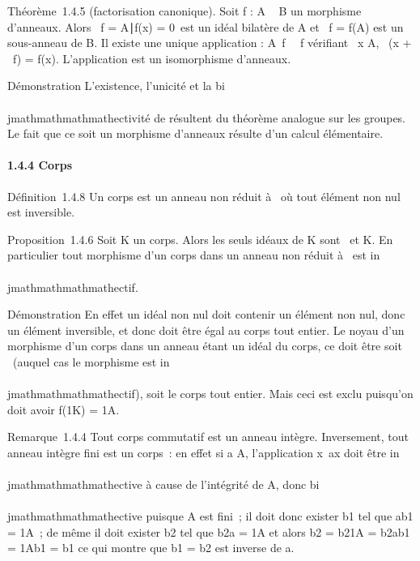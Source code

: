 Théorème~1.4.5 (factorisation canonique). Soit f : A \rightarrow~ B un morphisme
d'anneaux. Alors
\mathrmKer~f =
\x \in A∣f(x) =
0\ est un idéal bilatère de A et
\mathrmIm~f = f(A) est un
sous-anneau de B. Il existe une unique application
\overlinef :
A\diagup\mathrmKer~f
\rightarrow~\mathrmIm~f vérifiant
\forall~x \in A, \overlinef~(x
+ \mathrmKer~f) = f(x).
L'application \overlinef est un isomorphisme
d'anneaux.

Démonstration L'existence, l'unicité et la bi\\\\jmathmathmathmathectivité de
\overlinef résultent du théorème analogue sur les
groupes. Le fait que ce soit un morphisme d'anneaux résulte d'un calcul
élémentaire.

\paragraph{1.4.4 Corps}

Définition~1.4.8 Un corps est un anneau non réduit à
\0\ où tout élément non nul est
inversible.

Proposition~1.4.6 Soit K un corps. Alors les seuls idéaux de K sont
\0\ et K. En particulier tout
morphisme d'un corps dans un anneau non réduit à
\0\ est in\\\\jmathmathmathmathectif.

Démonstration En effet un idéal non nul doit contenir un élément non
nul, donc un élément inversible, et donc doit être égal au corps tout
entier. Le noyau d'un morphisme d'un corps dans un anneau étant un idéal
du corps, ce doit être soit \0\
(auquel cas le morphisme est in\\\\jmathmathmathmathectif), soit le corps tout entier. Mais
ceci est exclu puisqu'on doit avoir f(1K) = 1A.

Remarque~1.4.4 Tout corps commutatif est un anneau intègre. Inversement,
tout anneau intègre fini est un corps~: en effet si a \in A, l'application
x\mapsto~ax doit être in\\\\jmathmathmathmathective à cause de
l'intégrité de A, donc bi\\\\jmathmathmathmathective puisque A est fini~; il doit donc
exister b1 tel que ab1 = 1A~; de même il
doit exister b2 tel que b2a = 1A et alors
b2 = b21A = b2ab1 =
1Ab1 = b1 ce qui montre que b1 =
b2 est inverse de a.


